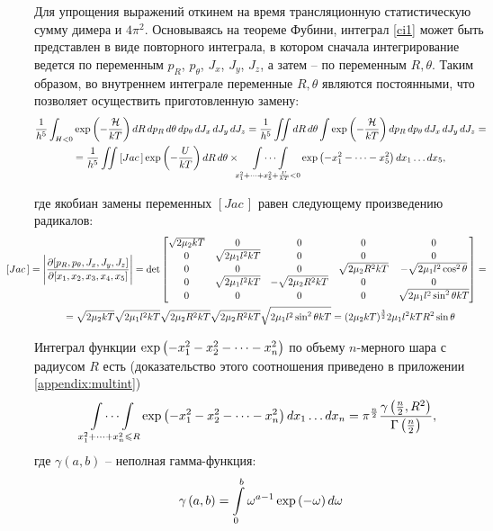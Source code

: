 Для упрощения выражений откинем на время трансляционную статистическую сумму димера и $4 \pi^2$. Основываясь на теореме Фубини, интеграл \eqref{ci1} может быть представлен в виде повторного интеграла, в котором сначала интегрирование ведется по переменным $p_R$, $p_\theta$, $J_x$, $J_y$, $J_z$, а затем  -- по переменным $R, \theta$. Таким образом, во внутреннем интеграле переменные $R, \theta$ являются постоянными, что позволяет осуществить приготовленную замену:
\vverh
\begin{gather}
	\frac{1}{h^5} \int_{H < 0} \exp \left( -\frac{\mathcal{H}}{kT} \right) dR \, dp_R \, d \theta \, dp_\theta \, d J_x \, d J_y \, d J_z = \frac{1}{h^5} \iint dR \, d \theta \int \exp \left( -\frac{\mathcal{H}}{kT} \right) d p_R \, d p_\theta \, d J_x \, d J_y \, d J_z = \notag \\
	= \frac{1}{h^5} \iint  \left[ Jac \, \right] \exp \left( -\frac{U}{kT} \right) d R \, d \theta \times \idotsint\limits_{x_1^2 + \dots + x_5^2 + \frac{U}{kT} < 0} \exp \left( - x_1^2 - \dots - x_5^2 \right) dx_1 \dots dx_5, \notag 
\end{gather}

\vlevo где якобиан замены переменных $\left[ Jac \, \right]$ равен следующему произведению радикалов: 
\begin{gather}
	\hspace*{-1.0cm}
	\left[ Jac \, \right] = \Bigg{|} \frac{\partial [p_R, p_\theta, J_x, J_y, J_z]}{\partial [x_1, x_2, x_3, x_4, x_5]} \Bigg{|} = \det  
	\begin{bmatrix}
		\sqrt{2 \mu_2 k T} & 0 & 0 & 0 & 0 \\
		0 & \sqrt{2 \mu_1 l^2 k T} & 0 & 0 & 0 \\
		0 & 0 & 0 & \sqrt{2 \mu_2 R^2 k T} & -\sqrt{2 \mu_1 l^2 \cos^2 \theta} \\
		0 & \sqrt{2 \mu_1 l^2 k T} & -\sqrt{2 \mu_2 R^2 k T} & 0 & 0 \\
		0 & 0 & 0 & 0 & \sqrt{2 \mu_1 l^2 \sin^2 \theta k T}
	\end{bmatrix} = \notag \\
	= \sqrt{2 \mu_2 k T} \sqrt{2 \mu_1 l^2 k T} \sqrt{2 \mu_2 R^2 kT} \sqrt{2 \mu_2 R^2 kT} \sqrt{2 \mu_1 l^2 \sin^2 \theta kT} = (2 \mu_2 kT)^\frac{3}{2} 2\mu_1 l^2 k T R^2 \sin \theta \notag
\end{gather}

Интеграл функции $\exp \left( - x_1^2  - x_2^2 - \dots - x_n^2 \right)$ по объему $n$-мерного шара с радиусом $R$ есть (доказательство этого соотношения приведено в приложении \eqref{appendix:multint})
\vverh
\begin{gather}
	\idotsint\limits_{x_1^2 + \dots + x_n^2 \leqslant R} \exp \left( -x_1^2 - x_2^2 - \dots - x_n^2 \right) d x_1 \dots d x_n = \pi^\frac{n}{2} \frac{\gamma \left( \frac{n}{2}, R^2 \right)}{\Gamma \left( \frac{n}{2} \right)}, \notag
\end{gather}
где $\gamma(a, b)$ -- неполная гамма-функция:
\vverh
\begin{gather}
	\gamma \left( a, b \right) = \int\limits_0^b \omega^{a - 1} \exp \left( - \omega \right) d \omega \notag
\end{gather}

